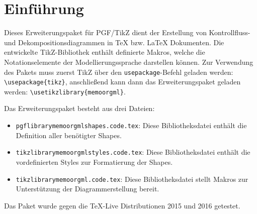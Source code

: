 \begin{figure}[htbp]
\end{figure}

\section{Einführung}
\label{sec:Einfuehrung}

Dieses Erweiterungspaket für PGF/TikZ dient der Erstellung von \memoorgml Kontrollfluss- und
Dekompositionsdiagrammen \citep{Frank:MEMOOrgML2} in \TeX{} bzw. \LaTeX{} Dokumenten.
Die entwickelte TikZ-Bibliothek enthält definierte Makros, welche die Notationselemente der Modellierungssprache \memoorgml darstellen können.
Zur Verwendung des Pakets muss zuerst TikZ über den \texttt{usepackage}-Befehl geladen werden: \lstinline|\usepackage{tikz}|, anschließend kann dann das Erweiterungspaket geladen werden: \lstinline|\usetikzlibrary{memoorgml}|.\medskip

\noindent Das Erweiterungspaket besteht aus drei Dateien:
\begin{itemize}
    \item {\texttt{pgflibrarymemoorgmlshapes.code.tex}: Diese Bibliotheksdatei enthält die Definition aller benötigter Shapes.}
    \item {\texttt{tikzlibrarymemoorgmlstyles.code.tex}: Diese Bibliotheksdatei enthält die vordefinierten Styles zur Formatierung der Shapes.}
    \item {\texttt{tikzlibrarymemoorgml.code.tex}: Diese Bibliotheksdatei stellt Makros zur Unterstützung der Diagrammerstellung bereit.}
\end{itemize}
\noindent Das Paket wurde gegen die \TeX-Live Distributionen 2015 und 2016 getestet.\medskip
\newpage

